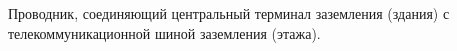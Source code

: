 Проводник, соединяющий центральный терминал заземления 
(здания) с телекоммуникационной шиной заземления (этажа).